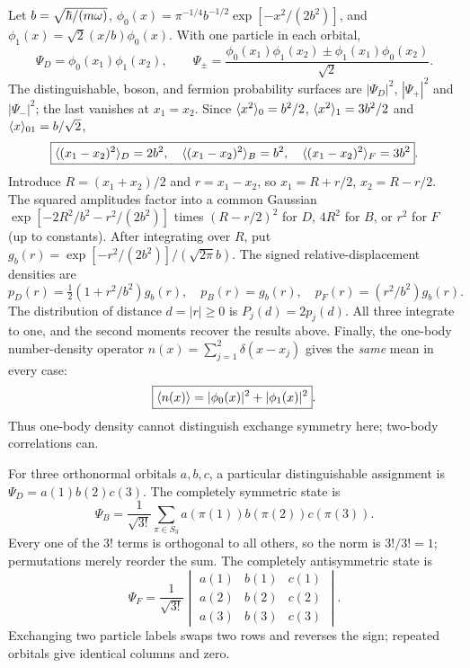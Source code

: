 Let $b=\sqrt{\hbar/(m\omega)}$,
$\phi_0(x)=\pi^{-1/4}b^{-1/2}
\exp[-x^2/(2b^2)]$,
and $\phi_1(x)=\sqrt2(x/b)\phi_0(x)$.
With one particle in each orbital,
\begin{equation}
\Psi_D=\phi_0(x_1)\phi_1(x_2),\qquad
\Psi_\pm=\frac{\phi_0(x_1)\phi_1(x_2)
\pm\phi_1(x_1)\phi_0(x_2)}{\sqrt2}.
\end{equation}
The distinguishable, boson, and fermion
probability surfaces are $|\Psi_D|^2$,
$|\Psi_+|^2$ and $|\Psi_-|^2$;
the last vanishes at $x_1=x_2$.
Since $\langle x^2\rangle_0=b^2/2$,
$\langle x^2\rangle_1=3b^2/2$ and
$\langle x\rangle_{01}=b/\sqrt2$,
\begin{equation}
\boxed{\langle (x_1-x_2)^2\rangle_D=2b^2,\quad
\langle (x_1-x_2)^2\rangle_B=b^2,\quad
\langle (x_1-x_2)^2\rangle_F=3b^2}.
\end{equation}
Introduce $R=(x_1+x_2)/2$ and
$r=x_1-x_2$, so
$x_1=R+r/2$, $x_2=R-r/2$.
The squared amplitudes factor into
a common Gaussian
$\exp[-2R^2/b^2-r^2/(2b^2)]$ times
$(R-r/2)^2$ for $D$, $4R^2$ for $B$,
or $r^2$ for $F$ (up to constants).
After integrating over $R$, put
$g_b(r)=\exp[-r^2/(2b^2)]/(\sqrt{2\pi}b)$.
The signed relative-displacement densities are
\begin{equation}
\boxed{p_D(r)=\tfrac12(1+r^2/b^2)g_b(r),\quad
p_B(r)=g_b(r),\quad
p_F(r)=(r^2/b^2)g_b(r)}.
\end{equation}
The distribution of distance $d=|r|\ge0$
is $\boxed{P_j(d)=2p_j(d)}$.
All three integrate to one, and the
second moments recover the results above.
Finally, the one-body number-density operator
$n(x)=\sum_{j=1}^2\delta(x-x_j)$ gives
the \emph{same} mean in every case:
\begin{equation}
\boxed{\langle n(x)\rangle=
|\phi_0(x)|^2+|\phi_1(x)|^2}.
\end{equation}
Thus one-body density cannot distinguish
exchange symmetry here; two-body correlations can.

For three orthonormal orbitals $a,b,c$,
a particular distinguishable assignment is
$\boxed{\Psi_D=a(1)b(2)c(3)}$.
The completely symmetric state is
\begin{equation}
\boxed{\Psi_B=\frac1{\sqrt{3!}}
\sum_{\pi\in S_3}
a(\pi(1))b(\pi(2))c(\pi(3))}.
\end{equation}
Every one of the $3!$ terms is orthogonal
to all others, so the norm is $3!/3!=1$;
permutations merely reorder the sum.
The completely antisymmetric state is
\begin{equation}
\boxed{\Psi_F=\frac1{\sqrt{3!}}
\begin{vmatrix}
a(1)&b(1)&c(1)\\
a(2)&b(2)&c(2)\\
a(3)&b(3)&c(3)
\end{vmatrix}}.
\end{equation}
Exchanging two particle labels swaps
two rows and reverses the sign; repeated
orbitals give identical columns and zero.

